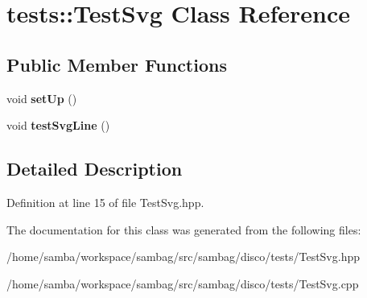 \hypertarget{classtests_1_1_test_svg}{
\section{tests::TestSvg Class Reference}
\label{classtests_1_1_test_svg}
}
\subsection*{Public Member Functions}
\begin{DoxyCompactItemize}
\item 
\hypertarget{classtests_1_1_test_svg_a39006df874d535ed8c71c90842fa106f}{
void {\bfseries setUp} ()}
\label{classtests_1_1_test_svg_a39006df874d535ed8c71c90842fa106f}

\item 
\hypertarget{classtests_1_1_test_svg_a3e1531286be6d26ab60bb6ad81b582fa}{
void {\bfseries testSvgLine} ()}
\label{classtests_1_1_test_svg_a3e1531286be6d26ab60bb6ad81b582fa}

\end{DoxyCompactItemize}


\subsection{Detailed Description}


Definition at line 15 of file TestSvg.hpp.



The documentation for this class was generated from the following files:\begin{DoxyCompactItemize}
\item 
/home/samba/workspace/sambag/src/sambag/disco/tests/TestSvg.hpp\item 
/home/samba/workspace/sambag/src/sambag/disco/tests/TestSvg.cpp\end{DoxyCompactItemize}
